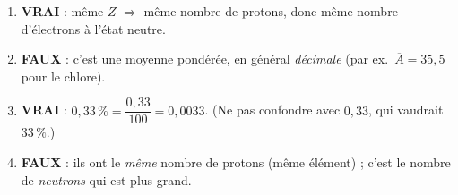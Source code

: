 \documentclass[11pt,a4paper]{article}
\begin{document}
\begin{corrige}
\begin{enumerate}[label=\alph*)]
  \item \textbf{\textcolor{excol}{VRAI}} : même $Z$ $\Rightarrow$ même nombre de protons, donc même
        nombre d'électrons à l'état neutre.
  \item \textbf{\textcolor{attncol}{FAUX}} : c'est une moyenne pondérée, en général \emph{décimale}
        (par ex.\ $\overline{A} = 35{,}5$ pour le chlore).
  \item \textbf{\textcolor{excol}{VRAI}} : $0{,}33\,\% = \dfrac{0{,}33}{100} = 0{,}0033$. (Ne pas
        confondre avec $0{,}33$, qui vaudrait $33\,\%$.)
  \item \textbf{\textcolor{attncol}{FAUX}} : ils ont le \emph{même} nombre de protons (même élément) ;
        c'est le nombre de \emph{neutrons} qui est plus grand.
\end{enumerate}
\end{corrige}
\end{document}
